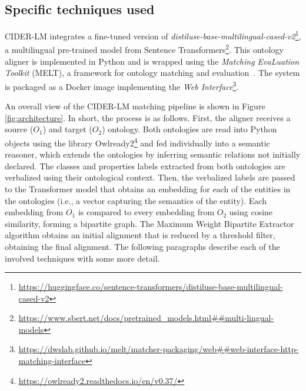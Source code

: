 \documentclass[
]{ceurart}
\begin{document}
\subsection{Specific techniques used}

CIDER-LM integrates a fine-tuned version of \textit{distiluse-base-multilingual-cased-v2}\footnote{\url{https://huggingface.co/sentence-transformers/distiluse-base-multilingual-cased-v2}}, a multilingual pre-trained model from Sentence Transformers\footnote{\url{https://www.sbert.net/docs/pretrained_models.html##multi-lingual-models}}.
This ontology aligner is implemented in Python and is wrapped using the \textit{Matching EvaLuation Toolkit} (MELT), a framework for ontology matching and evaluation~\cite{Hertling2019melt}. The system is packaged as a Docker image implementing the \textit{Web Interface}\footnote{\url{https://dwslab.github.io/melt/matcher-packaging/web##web-interface-http-matching-interface}}. 

An overall view of the CIDER-LM matching pipeline is shown in Figure \ref{fig:architecture}. In short, the process is as follows. First, the aligner receives a source ($O_1$) and target ($O_2$) ontology. Both ontologies are read into Python objects using the library Owlready2\footnote{\url{https://owlready2.readthedocs.io/en/v0.37/}} and fed individually into a semantic reasoner, which extends the ontologies by inferring semantic relations not initially declared. The classes and properties labels extracted from both ontologies are verbalized using their ontological context. Then, the verbalized labels are passed to the Transformer model that obtains an embedding for each of the entities in the ontologies (i.e., a vector capturing the semantics of the entity). Each embedding from $O_1$ is compared to every embedding from $O_2$ using cosine similarity, forming a bipartite graph. The Maximum Weight Bipartite Extractor algorithm obtains an initial alignment that is reduced by a threshold filter, obtaining the final alignment. The following paragraphs describe each of the involved techniques with some more detail.
\end{document}

